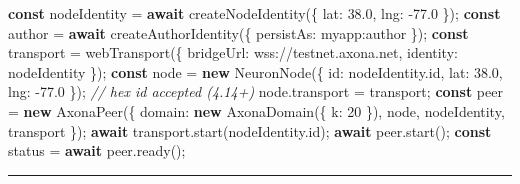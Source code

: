 \documentclass[
  nobib]{tufte-handout}
\newenvironment{Shaded}{}{}
\newcommand{\AttributeTok}[1]{\textcolor[rgb]{0.49,0.56,0.16}{#1}}
\newcommand{\CommentTok}[1]{\textcolor[rgb]{0.38,0.63,0.69}{\textit{#1}}}
\newcommand{\ControlFlowTok}[1]{\textcolor[rgb]{0.00,0.44,0.13}{\textbf{#1}}}
\newcommand{\DataTypeTok}[1]{\textcolor[rgb]{0.56,0.13,0.00}{#1}}
\newcommand{\DecValTok}[1]{\textcolor[rgb]{0.25,0.63,0.44}{#1}}
\newcommand{\FloatTok}[1]{\textcolor[rgb]{0.25,0.63,0.44}{#1}}
\newcommand{\FunctionTok}[1]{\textcolor[rgb]{0.02,0.16,0.49}{#1}}
\newcommand{\KeywordTok}[1]{\textcolor[rgb]{0.00,0.44,0.13}{\textbf{#1}}}
\newcommand{\NormalTok}[1]{#1}
\newcommand{\OperatorTok}[1]{\textcolor[rgb]{0.40,0.40,0.40}{#1}}
\newcommand{\StringTok}[1]{\textcolor[rgb]{0.25,0.44,0.63}{#1}}
\begin{document}
\begin{Shaded}
\begin{Highlighting}[]
\KeywordTok{const}\NormalTok{ nodeIdentity }\OperatorTok{=} \ControlFlowTok{await} \FunctionTok{createNodeIdentity}\NormalTok{(\{ }\DataTypeTok{lat}\OperatorTok{:} \FloatTok{38.0}\OperatorTok{,} \DataTypeTok{lng}\OperatorTok{:} \OperatorTok{{-}}\FloatTok{77.0}\NormalTok{ \})}\OperatorTok{;}
\KeywordTok{const}\NormalTok{ author }\OperatorTok{=} \ControlFlowTok{await} \FunctionTok{createAuthorIdentity}\NormalTok{(\{ }\DataTypeTok{persistAs}\OperatorTok{:} \StringTok{\textquotesingle{}myapp:author\textquotesingle{}}\NormalTok{ \})}\OperatorTok{;}
\KeywordTok{const}\NormalTok{ transport }\OperatorTok{=} \FunctionTok{webTransport}\NormalTok{(\{ }\DataTypeTok{bridgeUrl}\OperatorTok{:} \StringTok{\textquotesingle{}wss://testnet.axona.net\textquotesingle{}}\OperatorTok{,} \DataTypeTok{identity}\OperatorTok{:}\NormalTok{ nodeIdentity \})}\OperatorTok{;}
\KeywordTok{const}\NormalTok{ node }\OperatorTok{=} \KeywordTok{new} \FunctionTok{NeuronNode}\NormalTok{(\{ }\DataTypeTok{id}\OperatorTok{:}\NormalTok{ nodeIdentity}\OperatorTok{.}\AttributeTok{id}\OperatorTok{,} \DataTypeTok{lat}\OperatorTok{:} \FloatTok{38.0}\OperatorTok{,} \DataTypeTok{lng}\OperatorTok{:} \OperatorTok{{-}}\FloatTok{77.0}\NormalTok{ \})}\OperatorTok{;} \CommentTok{// hex id accepted (4.14+)}
\NormalTok{node}\OperatorTok{.}\AttributeTok{transport} \OperatorTok{=}\NormalTok{ transport}\OperatorTok{;}
\KeywordTok{const}\NormalTok{ peer }\OperatorTok{=} \KeywordTok{new} \FunctionTok{AxonaPeer}\NormalTok{(\{ }\DataTypeTok{domain}\OperatorTok{:} \KeywordTok{new} \FunctionTok{AxonaDomain}\NormalTok{(\{ }\DataTypeTok{k}\OperatorTok{:} \DecValTok{20}\NormalTok{ \})}\OperatorTok{,}
\NormalTok{                             node}\OperatorTok{,}\NormalTok{ nodeIdentity}\OperatorTok{,}\NormalTok{ transport \})}\OperatorTok{;}
\ControlFlowTok{await}\NormalTok{ transport}\OperatorTok{.}\FunctionTok{start}\NormalTok{(nodeIdentity}\OperatorTok{.}\AttributeTok{id}\NormalTok{)}\OperatorTok{;}
\ControlFlowTok{await}\NormalTok{ peer}\OperatorTok{.}\FunctionTok{start}\NormalTok{()}\OperatorTok{;}
\KeywordTok{const}\NormalTok{ status }\OperatorTok{=} \ControlFlowTok{await}\NormalTok{ peer}\OperatorTok{.}\FunctionTok{ready}\NormalTok{()}\OperatorTok{;}
\end{Highlighting}
\end{Shaded}

\begin{center}\rule{0.5\linewidth}{0.5pt}\end{center}
\end{document}
